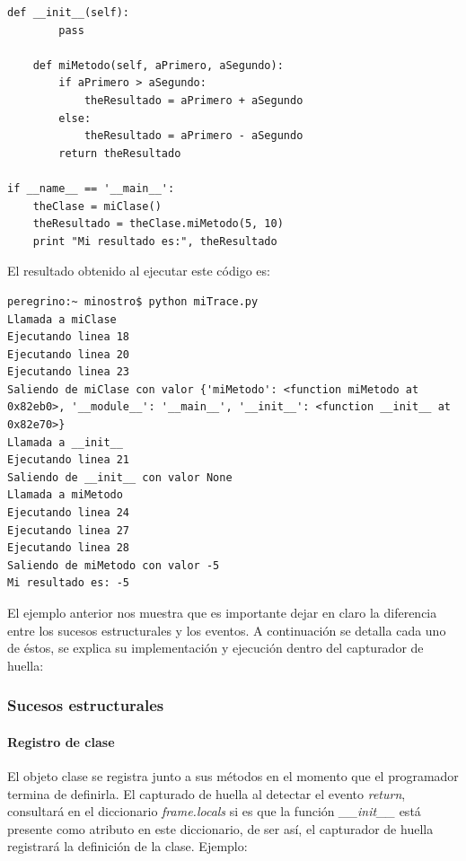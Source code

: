 \documentclass[12pt,legalpaper]{report}
\begin{document}
\begin{itemize}
\begin{singlespace}
\begin{lstlisting}[style=Python]
    def __init__(self):
        pass
    
    def miMetodo(self, aPrimero, aSegundo):
        if aPrimero > aSegundo:
            theResultado = aPrimero + aSegundo
        else:
            theResultado = aPrimero - aSegundo
        return theResultado

if __name__ == '__main__':
    theClase = miClase()
    theResultado = theClase.miMetodo(5, 10)
    print "Mi resultado es:", theResultado
\end{lstlisting}
\end{singlespace}

El resultado obtenido al ejecutar este código es:
\begin{singlespace}
\begin{lstlisting}[style=consola, numbers=none]
peregrino:~ minostro$ python miTrace.py
Llamada a miClase
Ejecutando linea 18
Ejecutando linea 20
Ejecutando linea 23
Saliendo de miClase con valor {'miMetodo': <function miMetodo at 0x82eb0>, '__module__': '__main__', '__init__': <function __init__ at 0x82e70>}
Llamada a __init__
Ejecutando linea 21
Saliendo de __init__ con valor None
Llamada a miMetodo
Ejecutando linea 24
Ejecutando linea 27
Ejecutando linea 28
Saliendo de miMetodo con valor -5
Mi resultado es: -5
\end{lstlisting}
\end{singlespace}
\end{itemize}

El ejemplo anterior nos muestra que es importante dejar en claro la diferencia entre los sucesos estructurales y los eventos.  A continuación se detalla cada uno de éstos, se explica su implementación y ejecución dentro del capturador de huella:

			\subsubsection{Sucesos estructurales}
			
				\paragraph{Registro de clase \label{registroClase}}

El objeto clase se registra junto a sus métodos en el momento que el programador termina de definirla.  El capturado de huella al detectar el evento \textit{return}, consultará en el diccionario \textit{frame.locals} si es que la función \textit{\_\_init\_\_} está presente como atributo en este diccionario, de ser así, el capturador de huella registrará la definición de la clase.  Ejemplo:
\end{document}
